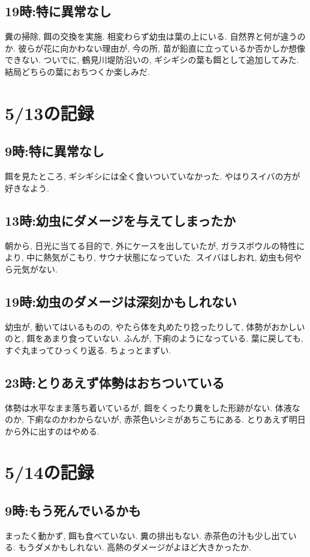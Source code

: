 \documentclass{jsarticle}
\begin{document}
\subsection{19時:特に異常なし}
糞の掃除, 餌の交換を実施. 相変わらず幼虫は葉の上にいる. 自然界と何が違うのか. 彼らが花に向かわない理由が, 
今の所, 苗が鉛直に立っているか否かしか想像できない. 
ついでに, 鶴見川堤防沿いの, ギシギシの葉も餌として追加してみた. 結局どちらの葉におちつくか楽しみだ. 

\section{5/13の記録}
\subsection{9時:特に異常なし}
餌を見たところ, ギシギシには全く食いついていなかった. 
やはりスイバの方が好きなよう.

\subsection{13時:幼虫にダメージを与えてしまったか}
朝から, 日光に当てる目的で, 外にケースを出していたが, 
ガラスボウルの特性により, 中に熱気がこもり, サウナ状態になっていた. 
スイバはしおれ, 幼虫も何やら元気がない. 

\subsection{19時:幼虫のダメージは深刻かもしれない}
幼虫が, 動いてはいるものの, やたら体を丸めたり捻ったりして, 体勢がおかしいのと, 餌をあまり食っていない. 
ふんが, 下痢のようになっている. 葉に戻しても, すぐ丸まってひっくり返る. ちょっとまずい. 

\subsection{23時:とりあえず体勢はおちついている}
体勢は水平なまま落ち着いているが, 餌をくったり糞をした形跡がない. 体液なのか, 下痢なのかわからないが, 
赤茶色いシミがあちこちにある. とりあえず明日から外に出すのはやめる. 

\section{5/14の記録}
\subsection{9時:もう死んでいるかも}
まったく動かず, 餌も食べていない. 糞の排出もない. 赤茶色の汁も少し出ている. 
もうダメかもしれない. 高熱のダメージがよほど大きかったか. 
\end{document}

